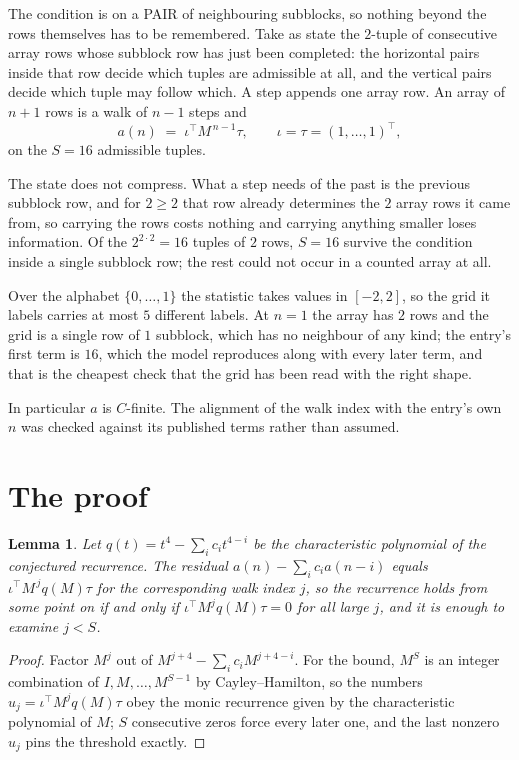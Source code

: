 \documentclass[11pt,a4paper]{article}
\theoremstyle{plain}
\newtheorem{lemma}[theorem]{Lemma}
\theoremstyle{definition}
\begin{document}
The condition is on a PAIR of neighbouring subblocks, so nothing beyond the
rows themselves has to be remembered. Take as state the $2$-tuple of consecutive array rows
whose subblock row has just been completed: the horizontal pairs inside that row decide which
tuples are admissible at all, and the vertical pairs decide which tuple may follow which. A
step appends one array row. An array of $n+1$ rows is a walk of $n-1$ steps and
\[
a(n)\;=\;\iota^{\!\top}M^{\,n-1}\tau,\qquad\iota=\tau=(1,\dots,1)^{\!\top},
\]
on the $S=16$ admissible tuples.

The state does not compress. What a step needs of the past is the previous subblock row, and
for $2\ge2$ that row already determines the $2$ array rows it came from, so carrying the
rows costs nothing and carrying anything smaller loses information. Of the $2^{2\cdot
2}=16$ tuples of $2$ rows, $S=16$ survive the condition inside a single subblock row;
the rest could not occur in a counted array at all.

Over the alphabet $\{0,\dots,1\}$ the statistic takes values in $[-2,2]$, so the
grid it labels carries at most $5$ different labels. At $n=1$ the array has $2$
rows and the grid is a single row of $1$
subblock, which has no neighbour of any kind; the entry's first term is
$16$, which the model reproduces along with every later term, and that is the cheapest
check that the grid has been read with the right shape.

In particular $a$ is $C$-finite. The alignment of the walk index with the entry's own $n$ was
checked against its published terms rather than assumed.

\section{The proof}

\begin{lemma}\label{lem:crit}
Let $q(t)=t^{4}-\sum_i c_it^{4-i}$ be the characteristic polynomial of the
conjectured recurrence. The residual $a(n)-\sum_ic_ia(n-i)$ equals
$\iota^{\!\top}M^{\,j}q(M)\tau$ for the corresponding walk index $j$, so the recurrence
holds from some point on if and only if $\iota^{\!\top}M^{j}q(M)\tau=0$ for all large $j$,
and it is enough to examine $j<S$.
\end{lemma}

\begin{proof}
Factor $M^{j}$ out of $M^{j+4}-\sum_ic_iM^{j+4-i}$. For the bound, $M^{S}$
is an integer combination of $I,M,\dots,M^{S-1}$ by Cayley--Hamilton, so the numbers
$u_j=\iota^{\!\top}M^{j}q(M)\tau$ obey the monic recurrence given by the characteristic
polynomial of $M$; $S$ consecutive zeros force every later one, and the last nonzero $u_j$
pins the threshold exactly.
\end{proof}
\end{document}
